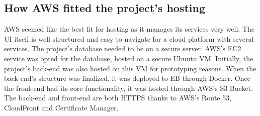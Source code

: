 \subsection{How AWS fitted the project's hosting}
AWS seemed like the best fit for hosting as it manages its services very well. The UI itself is well structured and easy to navigate for a cloud platform with several services. The project's database needed to be on a secure server. AWS's EC2 service was opted for the database, hosted on a secure Ubuntu VM. Initially, the project's back-end was also hosted on this VM for prototyping reasons. When the back-end's structure was finalized, it was deployed to EB through Docker. Once the front-end had its core functionality, it was hosted through AWS's S3 Bucket. The back-end and front-end are both HTTPS thanks to AWS's Route 53, CloudFront and Certificate Manager.

